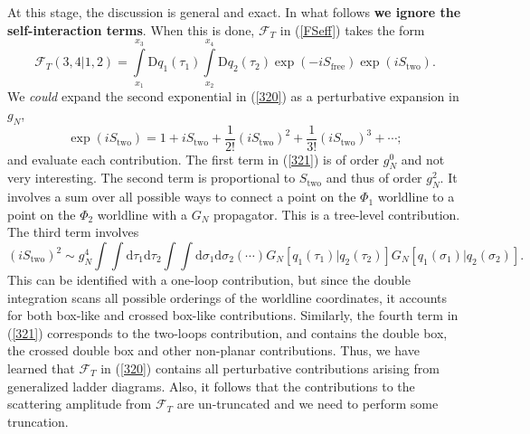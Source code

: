 At this stage, the discussion is general and exact. In what follows \textbf{we ignore the self-interaction terms}. When this is done, $\mathcal{F}_{T}$ in (\ref{FSeff}) takes the form
\begin{equation}
	\mathcal{F}_{T}(3, 4|1, 2) = \int\limits_{x_{1}}^{x_{3}} \mathrm{D}q_{1}(\tau_{1}) \int\limits_{x_{2}}^{x_{4}} \mathrm{D}q_{2}(\tau_{2}) \exp{\left( - i S_{\text{free}} \right)} \exp{\left( i S_{\text{two}} \right)}.
	\label{320}
\end{equation}
We \textit{could} expand the second exponential in (\ref{320}) as a perturbative expansion in $g_{N}$,
\begin{equation}
	\exp{\left( i S_{\text{two}} \right)} = 1 + i S_{\text{two}} + \frac{1}{2!} (i S_{\text{two}})^{2} + \frac{1}{3!} (i S_{\text{two}})^{3} + \cdots;
	\label{321}
\end{equation}
and evaluate each contribution. The first term in (\ref{321}) is of order $g_{N}^{0}$ and not very interesting. The second term is proportional to $S_{\text{two}}$ and thus of order $g_{N}^{2}$. It involves a sum over all possible ways to connect a point on the $\Phi_{1}$ worldline to a point on the $\Phi_{2}$ worldline with a $G_{N}$ propagator. This is a tree-level contribution. The third term involves
\begin{equation}
	(i S_{\text{two}})^{2} \sim g_{N}^{4} \int \int \mathrm{d}\tau_{1} \mathrm{d}\tau_{2} \int \int \mathrm{d}\sigma_{1} \mathrm{d}\sigma_{2} (\cdots) G_{N}[q_{1}(\tau_{1}) | q_{2}(\tau_{2})] G_{N}[q_{1}(\sigma_{1}) | q_{2}(\sigma_{2})].
\end{equation}
This can be identified with a one-loop contribution, but since the double integration scans all possible orderings of the worldline coordinates, it accounts for both box-like and crossed box-like contributions. Similarly, the fourth term in (\ref{321}) corresponds to the two-loops contribution, and contains the double box, the crossed double box and other non-planar contributions. Thus, we have learned that $\mathcal{F}_{T}$ in (\ref{320}) contains all perturbative contributions arising from generalized ladder diagrams. Also, it follows that the contributions to the scattering amplitude from $\mathcal{F}_{T}$ are un-truncated and we need to perform some truncation.

